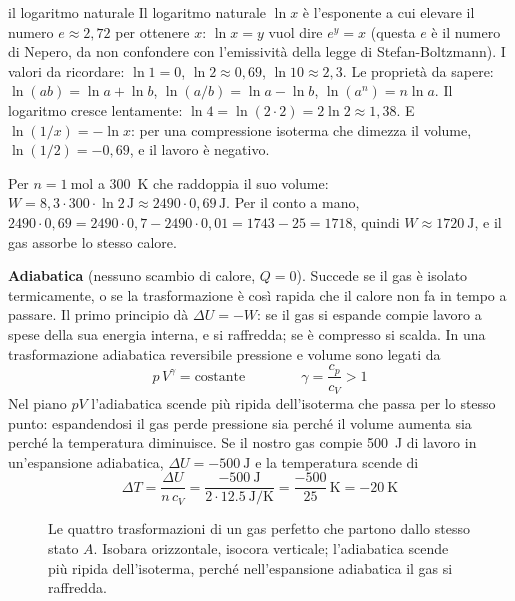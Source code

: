 \begin{richiamo}{il logaritmo naturale}
Il logaritmo naturale $\ln x$ è l'esponente a cui elevare il numero $e \approx 2{,}72$ per ottenere $x$: $\ln x = y$ vuol dire $e^{y} = x$ (questa $e$ è il numero di Nepero, da non confondere con l'emissività della legge di Stefan-Boltzmann). I valori da ricordare: $\ln 1 = 0$, $\ln 2 \approx 0{,}69$, $\ln 10 \approx 2{,}3$. Le proprietà da sapere: $\ln(ab) = \ln a + \ln b$, $\ln(a/b) = \ln a - \ln b$, $\ln(a^{n}) = n \ln a$. Il logaritmo cresce lentamente: $\ln 4 = \ln(2 \cdot 2) = 2 \ln 2 \approx 1{,}38$. E $\ln(1/x) = -\ln x$: per una compressione isoterma che dimezza il volume, $\ln(1/2) = -0{,}69$, e il lavoro è negativo.
\end{richiamo}

Per $n = \SI{1}{\mole}$ a \SI{300}{\kelvin} che raddoppia il suo volume: $W = 8{,}3 \cdot 300 \cdot \ln 2\,\si{\joule} \approx 2490 \cdot 0{,}69\,\si{\joule}$. Per il conto a mano, $2490 \cdot 0{,}69 = 2490 \cdot 0{,}7 - 2490 \cdot 0{,}01 = 1743 - 25 = 1718$, quindi $W \approx \SI{1720}{\joule}$, e il gas assorbe lo stesso calore.

\textbf{Adiabatica} (nessuno scambio di calore, $Q = 0$). Succede se il gas è isolato termicamente, o se la trasformazione è così rapida che il calore non fa in tempo a passare. Il primo principio dà $\Delta U = -W$: se il gas si espande compie lavoro a spese della sua energia interna, e si raffredda; se è compresso si scalda. In una trasformazione adiabatica reversibile pressione e volume sono legati da
\[
  p\,V^{\gamma} = \text{costante}
  \qquad\qquad
  \gamma = \frac{c_p}{c_V} > 1
\]
Nel piano $pV$ l'adiabatica scende più ripida dell'isoterma che passa per lo stesso punto: espandendosi il gas perde pressione sia perché il volume aumenta sia perché la temperatura diminuisce. Se il nostro gas compie \SI{500}{\joule} di lavoro in un'espansione adiabatica, $\Delta U = \SI{-500}{\joule}$ e la temperatura scende di
\[
  \Delta T = \frac{\Delta U}{n\,c_V} = \frac{\SI{-500}{\joule}}{2 \cdot \SI{12,5}{\joule\per\kelvin}} = \frac{-500}{25}\,\si{\kelvin} = \SI{-20}{\kelvin}
\]

\begin{figure}[h]
\centering

\caption{Le quattro trasformazioni di un gas perfetto che partono dallo stesso stato $A$. Isobara orizzontale, isocora verticale; l'adiabatica scende più ripida dell'isoterma, perché nell'espansione adiabatica il gas si raffredda.}
\label{fig:ud5-trasformazioni}
\end{figure}

